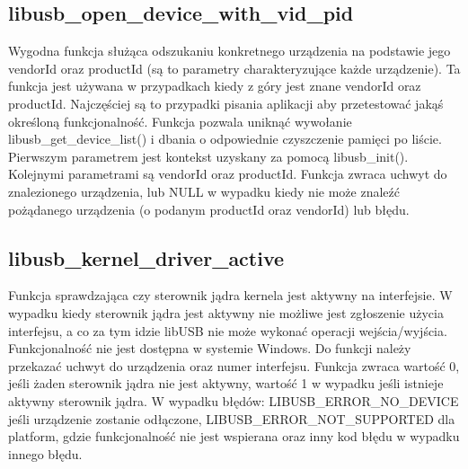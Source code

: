 \documentclass{BscUS}
\begin{document}
\subsection{libusb\_open\_device\_with\_vid\_pid}
\noindent Wygodna funkcja służąca odszukaniu konkretnego urządzenia na podstawie jego vendorId oraz productId (są to parametry charakteryzujące każde urządzenie).
Ta funkcja jest używana w przypadkach kiedy z góry jest znane vendorId oraz productId. Najczęściej są to przypadki pisania aplikacji aby przetestować jakąś określoną funkcjonalność. Funkcja pozwala uniknąć wywołanie libusb\_get\_device\_list() i dbania o odpowiednie czyszczenie pamięci po liście.
Pierwszym parametrem jest kontekst uzyskany za pomocą libusb\_init().
Kolejnymi parametrami są vendorId oraz productId.
Funkcja zwraca uchwyt do znalezionego urządzenia, lub NULL w wypadku kiedy nie może znaleźć pożądanego urządzenia (o podanym productId oraz vendorId) lub błędu.
\subsection{libusb\_kernel\_driver\_active}
\noindent Funkcja sprawdzająca czy sterownik jądra kernela jest aktywny na interfejsie.
W wypadku kiedy sterownik jądra jest aktywny nie możliwe jest zgłoszenie użycia interfejsu, a co za tym idzie libUSB nie może wykonać operacji wejścia/wyjścia.
Funkcjonalność nie jest dostępna w systemie Windows.
Do funkcji należy przekazać uchwyt do urządzenia oraz numer interfejsu.
Funkcja zwraca wartość 0, jeśli żaden sterownik jądra nie jest aktywny, wartość 1 w wypadku jeśli istnieje aktywny sterownik jądra.
\newline
W wypadku błędów: LIBUSB\_ERROR\_NO\_DEVICE jeśli urządzenie zostanie odłączone, LIBUSB\_ERROR\_NOT\_SUPPORTED dla platform, gdzie funkcjonalność nie jest wspierana oraz inny kod błędu w wypadku innego błędu.
\end{document}
